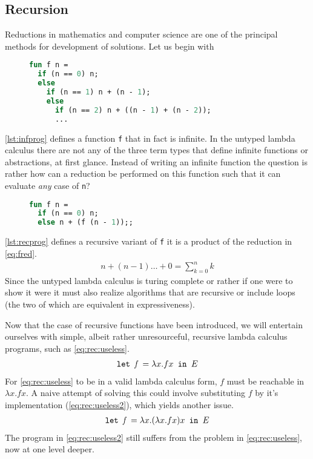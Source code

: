 \subsection{Recursion}
\label{sec:lamrec}
\noindent Reductions in mathematics and computer science are one of the principal methods for development of solutions.
Let us begin with 
\begin{figure}
\begin{lstlisting}[language=ML,caption={Infinite program},label={lst:infprog}]
fun f n = 
  if (n == 0) n;
  else 
    if (n == 1) n + (n - 1);
    else 
      if (n == 2) n + ((n - 1) + (n - 2));
      ...
\end{lstlisting}
\end{figure}
\autoref{lst:infprog} defines a function \texttt{f} that in fact is infinite.
In the untyped lambda calculus there are not any of the three term types that define infinite functions or abstractions, at first glance.
Instead of writing an infinite function the question is rather how can a reduction be performed on this function such that it can evaluate \textit{any} case of \texttt{n}?
\begin{figure}
\begin{lstlisting}[language=ML,caption={Recursive program},label={lst:recprog}]
fun f n = 
  if (n == 0) n;
  else n + (f (n - 1));;
\end{lstlisting}
\end{figure}
\autoref{lst:recprog} defines a recursive variant of \texttt{f} it is a product of the reduction in \autoref{eq:fred}.
\begin{align}
    n + (n - 1) \dots + 0 = \sum_{k = 0}^n k
    \label{eq:fred}
\end{align}
Since the untyped lambda calculus is turing complete or rather if one were to show it were it must also realize algorithms that are recursive or include loops (the two of which are equivalent in expressiveness).

Now that the case of recursive functions have been introduced, we will entertain ourselves with simple, albeit rather unresourceful, recursive lambda calculus programs, such as \autoref{eq:rec:useless}.
\begin{align}
  \texttt{let } \textit{f } = \lambda x. f x \texttt{ in } E\label{eq:rec:useless}
\end{align}
For \autoref{eq:rec:useless} to be in a valid lambda calculus form, $f$ must be reachable in $\lambda x.fx$.
A naive attempt of solving this could involve substituting $f$ by it's implementation (\autoref{eq:rec:useless2}), which yields another issue.
\begin{align}
  \texttt{let } \textit{f } = \lambda x. (\lambda x. fx) x \texttt{ in } E\label{eq:rec:useless2}
\end{align}
The program in \autoref{eq:rec:useless2} still suffers from the problem in \autoref{eq:rec:useless}, now at one level deeper.

